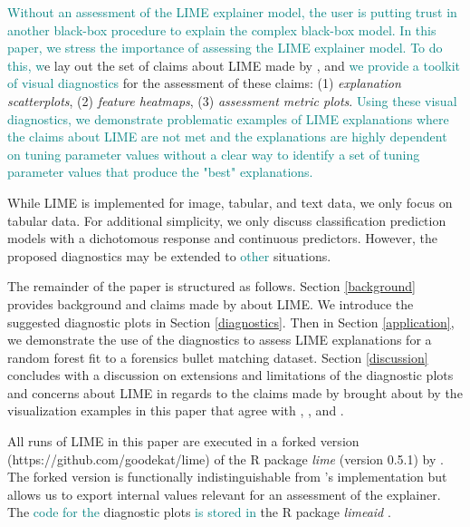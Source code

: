 \documentclass[AMS,STIX2COL]{WileyNJD-v2}\usepackage[]{graphicx}\usepackage[]{color}
\newcommand{\kge}[1]{\textcolor{teal}{#1}}
\renewcommand{\sout}[1]{\unskip}
\begin{document}
\sout{As a result of the various ways LIME can fail, it is important to assess LIME explanations. We suggest the use of visual diagnostics for assessment. In this paper,} \kge{Without an assessment of the LIME explainer model, the user is putting trust in another black-box procedure to explain the complex black-box model. In this paper, we stress the importance of assessing the LIME explainer model.} \kge{To do this, w}e lay out the set of claims about LIME made by \citet{ribeiro:2016}, and \kge{we provide a toolkit of visual diagnostics} \sout{propose three visualizations} for the assessment of these claims: (1) \emph{explanation scatterplots}, (2) \emph{feature heatmaps}, (3) \emph{assessment metric plots}. \kge{Using these visual diagnostics, we demonstrate problematic examples of LIME explanations where the claims about LIME are not met and the explanations are highly dependent on tuning parameter values without a clear way to identify a set of tuning parameter values that produce the "best" explanations.}

While LIME is implemented for image, tabular, and text data, we only focus on tabular data. For additional simplicity, we only discuss classification prediction models with a dichotomous response \sout{variable} and continuous predictor\sout{ variable}s. However, the proposed diagnostics may be extended to \kge{other} \sout{a wider range of} situations.

The remainder of the paper is structured as follows. Section \ref{background} provides background and claims made by \citet{ribeiro:2016} about LIME. We introduce the suggested diagnostic plots in Section \ref{diagnostics}. Then in Section \ref{application}, we demonstrate the use of the diagnostics to assess LIME explanations for a random forest  fit to a forensics bullet matching dataset. Section \ref{discussion} concludes with a discussion on extensions and limitations of the diagnostic plots and concerns about LIME in regards to the claims made by \citet{ribeiro:2016} brought about by the visualization examples in this paper that agree with \citet{alvarezmelis:2018}, \citet{laugel:2018}, and \citet{molnar:2019}.

All runs of LIME in this paper are executed in a forked version (https://github.com/goodekat/lime) of the R package \emph{lime} (version 0.5.1) by \citet{pedersen:2020}. The forked version is functionally indistinguishable from \citeauthor{pedersen:2020}'s implementation but allows us to export internal values relevant for an assessment of the explainer. The \kge{code for the} diagnostic plots \sout{included in this paper} \kge{is stored in} \sout{are created using} the R package \emph{limeaid} \citep{goode:2020}.
\end{document}
